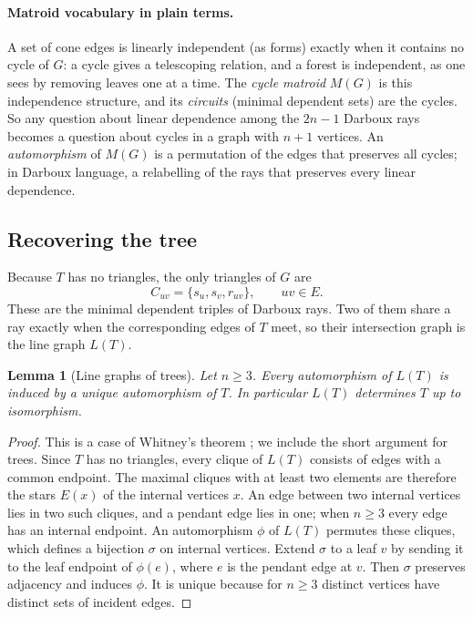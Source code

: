 \documentclass[11pt,a4paper]{article}
\newtheorem{lemma}[theorem]{Lemma}
\theoremstyle{definition}
\theoremstyle{remark}
\begin{document}
\paragraph{Matroid vocabulary in plain terms.}
A set of cone edges is linearly independent (as forms) exactly when it contains no cycle of $G$: a cycle gives a telescoping relation, and a forest is independent, as one sees by removing leaves one at a time. The \emph{cycle matroid} $M(G)$ is this independence structure, and its \emph{circuits} (minimal dependent sets) are the cycles. So any question about linear dependence among the $2n-1$ Darboux rays becomes a question about cycles in a graph with $n+1$ vertices. An \emph{automorphism} of $M(G)$ is a permutation of the edges that preserves all cycles; in Darboux language, a relabelling of the rays that preserves every linear dependence.

\subsection{Recovering the tree}

Because $T$ has no triangles, the only triangles of $G$ are
\begin{equation}
 C_{uv}=\{s_u,s_v,r_{uv}\},
 \qquad uv\in E.
 \label{lv:eq:triangles}
\end{equation}
These are the minimal dependent triples of Darboux rays. Two of them share a ray exactly when the corresponding edges of $T$ meet, so their intersection graph is the line graph $L(T)$.

\begin{lemma}[Line graphs of trees]
\label{lv:lem:line-graph}
Let $n\geq3$. Every automorphism of $L(T)$ is induced by a unique automorphism of $T$. In particular $L(T)$ determines $T$ up to isomorphism.
\end{lemma}

\begin{proof}
This is a case of Whitney's theorem \cite{lv:Whitney1932,lv:Jung1966}; we include the short argument for trees. Since $T$ has no triangles, every clique of $L(T)$ consists of edges with a common endpoint. The maximal cliques with at least two elements are therefore the stars $E(x)$ of the internal vertices $x$. An edge between two internal vertices lies in two such cliques, and a pendant edge lies in one; when $n\geq3$ every edge has an internal endpoint. An automorphism $\phi$ of $L(T)$ permutes these cliques, which defines a bijection $\sigma$ on internal vertices. Extend $\sigma$ to a leaf $v$ by sending it to the leaf endpoint of $\phi(e)$, where $e$ is the pendant edge at $v$. Then $\sigma$ preserves adjacency and induces $\phi$. It is unique because for $n\geq3$ distinct vertices have distinct sets of incident edges.
\end{proof}
\end{document}
